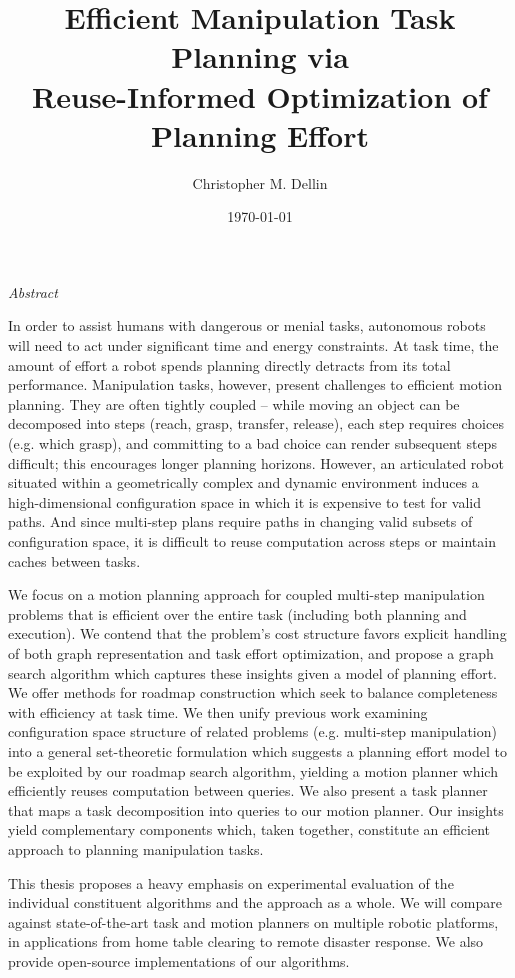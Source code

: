 \documentclass[nobib]{tufte-book}
\title{Efficient Manipulation Task Planning via\\
   Reuse-Informed Optimization of Planning Effort
   \cdnote{need new title!}}
\author{Christopher M. Dellin}
\date{\today}
\newcommand{\cdnote}[1]{{\xxnote{CD}{blue}{#1}}}
\newcommand{\xxnote}[3]{}
\renewcommand{\xxnote}[3]{\color{#2}{#1: #3}}
\begin{document}
\maketitle

\begin{fullwidth}
\begin{adjustwidth}{1in}{1in}

{\LARGE \emph{Abstract}}

\vspace{0.2in}

\cdnote{todo: rewrite abstract}

In order to assist humans
with dangerous or menial tasks,
autonomous robots will need to
act under significant time and energy constraints.
At task time,
the amount of effort a robot spends planning directly
detracts from its total performance.
Manipulation tasks, however, present challenges
to efficient motion planning.
They are often tightly coupled --
while moving an object can be decomposed into
steps (reach, grasp, transfer, release),
each step requires choices (e.g. which grasp),
and committing to a bad choice
can render subsequent steps difficult;
this encourages longer planning horizons.
However,
an articulated robot
situated within a geometrically complex and dynamic environment
induces a high-dimensional configuration space
in which it is expensive to test for valid paths.
And since multi-step plans
require paths in changing valid subsets of configuration space,
it is difficult to reuse computation across steps
or maintain caches between tasks.

We focus on a motion planning approach for coupled multi-step
manipulation problems that is efficient over the entire task
(including both planning and execution).
We contend that the problem's cost structure
favors explicit handling of
both graph representation and task effort optimization,
and propose a graph search algorithm which captures these insights
given a model of planning effort.
We offer methods for roadmap construction
which seek to balance completeness with efficiency at task time.
We then unify previous work examining configuration space structure of
related problems (e.g. multi-step manipulation)
into a general set-theoretic formulation
which suggests a planning effort model
to be exploited by our roadmap search algorithm,
yielding a motion planner which
efficiently reuses computation between queries.
We also present a task planner
that maps a task decomposition into queries to our motion planner.
Our insights yield complementary components
which, taken together,
constitute an efficient approach to planning manipulation tasks.

This thesis proposes a heavy emphasis on experimental evaluation
of the individual constituent algorithms
and the approach as a whole.
We will compare against
state-of-the-art task and motion planners
on multiple robotic platforms,
in applications from home table clearing
to remote disaster response.
We also provide open-source implementations of our algorithms.

\end{adjustwidth}
\end{fullwidth}
\end{document}
